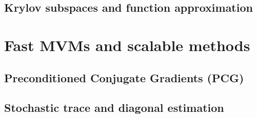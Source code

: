 \documentclass[12pt, leqno]{article} %
\begin{document}
\subsection{Krylov subspaces and function approximation}

\section{Fast MVMs and scalable methods}

\subsection{Preconditioned Conjugate Gradients (PCG)}

\subsection{Stochastic trace and diagonal estimation}
\end{document}
